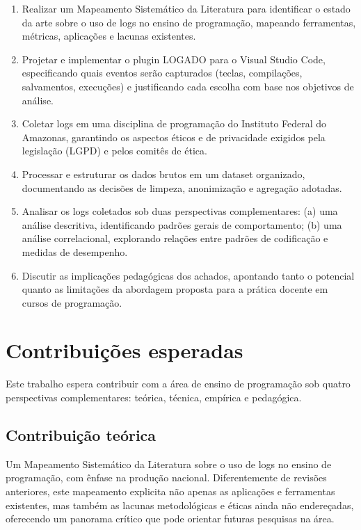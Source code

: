 \begin{enumerate}
    \item Realizar um Mapeamento Sistemático da Literatura para identificar o estado da arte sobre o uso de logs no ensino de programação, mapeando ferramentas, métricas, aplicações e lacunas existentes.
    
    \item Projetar e implementar o plugin LOGADO para o Visual Studio Code, especificando quais eventos serão capturados (teclas, compilações, salvamentos, execuções) e justificando cada escolha com base nos objetivos de análise.
    
    \item Coletar logs em uma disciplina de programação do Instituto Federal do Amazonas, garantindo os aspectos éticos e de privacidade exigidos pela legislação (LGPD) e pelos comitês de ética.
    
    \item Processar e estruturar os dados brutos em um dataset organizado, documentando as decisões de limpeza, anonimização e agregação adotadas.
    
    \item Analisar os logs coletados sob duas perspectivas complementares: (a) uma análise descritiva, identificando padrões gerais de comportamento; (b) uma análise correlacional, explorando relações entre padrões de codificação e medidas de desempenho.
    
    \item Discutir as implicações pedagógicas dos achados, apontando tanto o potencial quanto as limitações da abordagem proposta para a prática docente em cursos de programação.
\end{enumerate}

\section{Contribuições esperadas}
\label{sec:contribuicoes}

Este trabalho espera contribuir com a área de ensino de programação sob quatro perspectivas complementares: teórica, técnica, empírica e pedagógica.

\subsection*{Contribuição teórica}

Um Mapeamento Sistemático da Literatura sobre o uso de logs no ensino de programação, com ênfase na produção nacional. Diferentemente de revisões anteriores, este mapeamento explicita não apenas as aplicações e ferramentas existentes, mas também as lacunas metodológicas e éticas ainda não endereçadas, oferecendo um panorama crítico que pode orientar futuras pesquisas na área.

